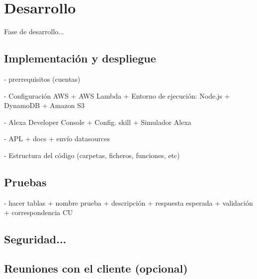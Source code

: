 \section{Desarrollo}
Fase de desarrollo...

\subsection{Implementación y despliegue}

- prerrequisitos (cuentas)

- Configuración AWS
+ AWS Lambda
+ Entorno de ejecución: Node.js
+ DynamoDB
+ Amazon S3

- Alexa Developer Console
+ Config. skill
+ Simulador Alexa

- APL
+ docs
+ envío datasources

- Estructura del código (carpetas, ficheros, funciones, etc)

\subsection{Pruebas}
- hacer tablas
+ nombre prueba
+ descripción
+ respuesta esperada
+ validación
+ correspondencia CU

\subsection{Seguridad...}

\subsection{Reuniones con el cliente (opcional)}